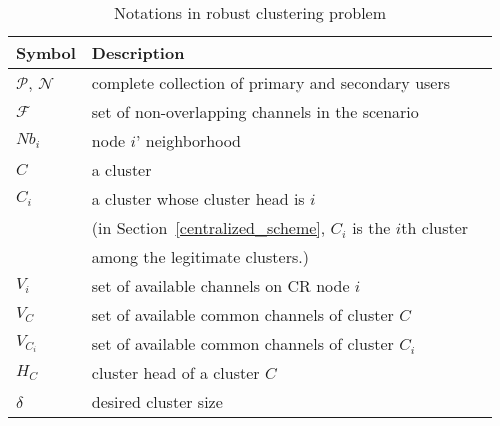 \documentclass[journal,comsoc]{IEEEtran}
\theoremstyle{mytheoremstyle}
\theoremstyle{mytheoremstyle}
\theoremstyle{mytheoremstyle}
\newcommand{\ie}{i.e., }
\begin{document}

\begin{table}[h!]
\caption{Notations in robust clustering problem}
\label{tab1}
\centering
\begin{tabular}{llr}
\toprule
Symbol & Description \\
\midrule
$\mathcal{P}$, $\mathcal{N}$  & complete collection of primary and secondary users\\
$\mathcal{F}$ & set of non-overlapping channels in the scenario\\
$Nb_i$ & node $i$' neighborhood     \\
$C$ & a cluster \\
$C_i$ & a cluster whose cluster head is $i$ \\
& (in Section~\ref{centralized_scheme}, $C_i$ is the $i$th cluster \\
& among the legitimate clusters.)\\
$V_i$   & set of available channels on CR node $i$  \\
$V_C$   & set of available common channels of cluster $C$  \\
$V_{C_i}$   & set of available common channels of cluster $C_i$\\
$H_C$ & cluster head of a cluster $C$\\
$\delta$ & desired cluster size\\

\end{tabular}
\end{table}
\end{document}
